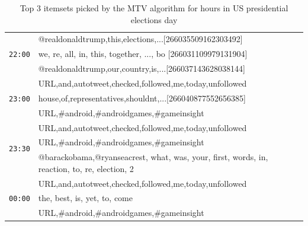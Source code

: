 \documentclass[letterpaper,12pt,titlepage,oneside,final]{book}
\begin{document}
 

 
 \begin{table}
 \begin{center}
\small
\def\arraystretch{1.1}
\begin{tabular}{|p{1cm}|p{17.5cm}|}

\hline

\multirow{3}{*}{\texttt{22:00}}

& @realdonaldtrump,this,elections,...[266035509162303492] \\\cline{2-2} %
&we, re, all, in, this, together, ..., bo [266031109979131904]  \\\cline{2-2} %
& @realdonaldtrump,our,country,is,...[266037143628038144] \\\hline %



\multirow{3}{*}{\texttt{23:00}}

&URL,and,autotweet,checked,followed,me,today,unfollowed \\\cline{2-2}
&house,of,representatives,shouldnt,...[266040877552656385]  \\\cline{2-2} %
& URL,\#android,\#androidgames,\#gameinsight \\\hline 

\multirow{3}{*}{\texttt{23:30}}

&URL,and,autotweet,checked,followed,me,today,unfollowed \\\cline{2-2}
&URL,\#android,\#androidgames,\#gameinsight  \\\cline{2-2} 
&@barackobama,@ryanseacrest, what, was, your, first, words, in, reaction, to, re, election, 2\\\hline 


\multirow{3}{*}{\texttt{00:00}}

&URL,and,autotweet,checked,followed,me,today,unfollowed \\\cline{2-2}

&the, best, is, yet, to, come \\\cline{2-2} 
 & URL,\#android,\#androidgames,\#gameinsight \\\hline 

\end{tabular}
\end{center}
\caption{Top 3 itemsets picked by the MTV algorithm for hours in US presidential elections day}
 \label{table:mtv}
\end{table}
\end{document}
